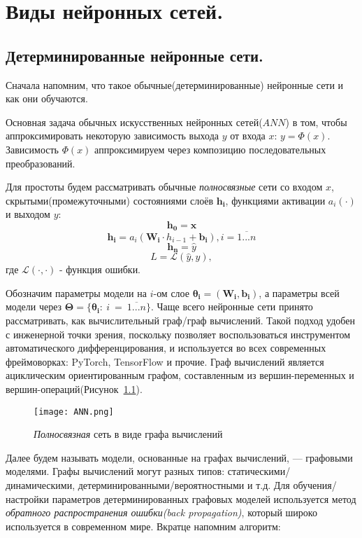 \chapter{Виды нейронных сетей.}

\section{Детерминированные нейронные сети.}

Сначала напомним, что такое обычные(детерминированные) нейронные сети и как они обучаются.

Основная задача обычных искусственных нейронных сетей($ANN$) в том, чтобы аппроксимировать некоторую зависимость выхода $y$ от
 входа $x$: $y = \Phi(x)$. Зависимость $\Phi(x)$ аппроксимируем через композицию последовательных преобразований.

Для простоты будем рассматривать обычные \textit{полносвязные} сети со входом $x$,
 скрытыми(промежуточными) состояниями слоёв $\bm{h_i}$, функциями активации $a_i(\cdot)$ и выходом $y$:
$$\bm{h_0} = \bm{x}$$
$$\bm{h_i} = a_i(\bm{W_i} \cdot h_{i-1} + \bm{b_i}), i = \overline{1...n}$$
$$\bm{h_n} = \widehat{y}$$
$$L = \mathcal{L}(\widehat{y}, y),$$ где $\mathcal{L}(\cdot, \cdot)$ - функция ошибки.

Обозначим параметры модели на $i$-ом слое $\bm{\theta_i} = (\bm{W_i}, \bm{b_i})$, а параметры всей модели через $\bm{\Theta} = \{\bm{\theta_i} :~i~=~\overline{1...n}\}$.
Чаще всего нейронные сети принято рассматривать, как вычислительный граф/граф вычислений.
 Такой подход удобен с инженерной точки зрения, поскольку позволяет воспользоваться инструментом автоматического
 дифференцирования, и используется во всех современных фреймоворках: PyTorch, TensorFlow и прочие.
 Граф вычислений является ациклическим ориентированным графом, составленным из вершин-переменных и вершин-операций(Рисунок~\ref{fig:ANN}).
\begin{figure}[H]
    \centering
    \texttt{[image: ANN.png]}
    \caption{\textit{Полносвязная} сеть в виде графа вычислений}
    \label{fig:ANN}
\end{figure}

Далее будем называть модели, основанные на графах вычислений, --- графовыми моделями. Графы вычислений могут разных типов:
 статическими/динамическими, детерминированными/вероятностными и т.д. Для обучения/настройки параметров детерминированных графовых моделей
 используется метод \textit{обратного распространения ошибки(back propagation)}, который широко используется в современном мире. Вкратце напомним алгоритм:

